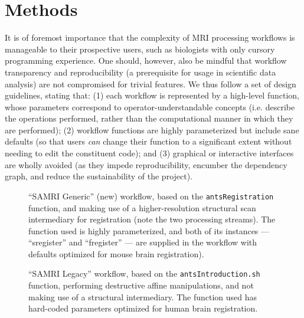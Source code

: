 \section{Methods}
It is of foremost importance that the complexity of MRI processing workflows is manageable to their prospective users, such as biologists with only cursory programming experience.
One should, however, also be mindful that workflow transparency and reproducibility (a prerequisite for usage in scientific data analysis) are not compromised for trivial features.
We thus follow  a set of design guidelines, stating that:
(1) each workflow is represented by a high-level function, whose parameters correspond to operator-understandable concepts (i.e. describe the operations performed, rather than the computational manner in which they are performed);
(2) workflow functions are highly parameterized but include sane defaults (so that users \textit{can} change their function to a significant extent without needing to edit the constituent code);
and (3) graphical or interactive interfaces are wholly avoided (as they impede reproducibility, encumber the dependency graph, and reduce the sustainability of the project).

\begin{figure*}[h!]
	\begin{subfigure}{.66\textwidth}
		\centering
		\vspace{.55em}
		\caption{
			“SAMRI Generic” (new) workflow, based on the \textcolor{mg}{\texttt{antsRegistration}} function, and  making use of a higher-resolution structural scan intermediary for registration (note the two processing streams).
			The function used is highly parameterized, and both of its instances --- “s\niceus register” and “f\niceus register” --- are supplied in the workflow with defaults optimized for mouse brain registration).
			}
		\label{fig:wfgg}
	\end{subfigure}\hfill
	\begin{subfigure}{.31\textwidth}
		\centering
		\caption{
			“SAMRI Legacy” workflow, based on the \textcolor{mg}{\texttt{antsIntroduction.sh}} function, performing destructive affine manipulations, and not making use of a structural intermediary.
			The function used has hard-coded parameters optimized for human brain registration.
			}
		\label{fig:wfgl}
	\end{subfigure}
	\caption{
		Directed acyclic graphs depicting the two alternate MRI registration workflows and their constituent processing steps.
		The package correspondence of each processing node is appended in parantheses to the node name.
		The “utility” indication corresponds to nodes based on Python functions specific to the workflow, distributed alongside it, and dynamically wrapped via Nipype.
		The “extra\niceus interfaces” indication corresponds to nodes using explicitly defined Nipype-style interfaces, which are specific to the workflow and distributed alongside it.
		}
	\label{fig:wfg}
\end{figure*}

